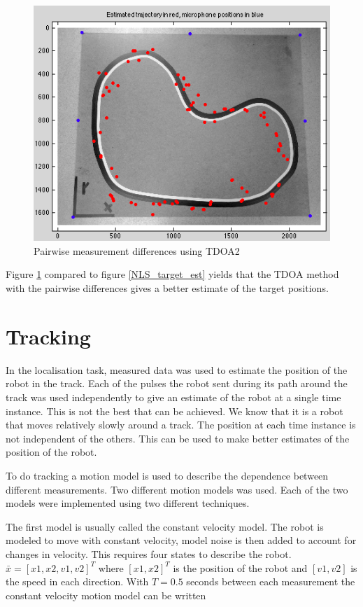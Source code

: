 \documentclass[10pt,a4paper]{report}
\begin{document}
 \begin{figure}[H]
   \includegraphics[width = 350pt]{TDAO_target_est2.png}
   \caption{Pairwise measurement differences using TDOA2}
   \label{TDOA_target_est2}
 \end{figure}
Figure \ref{TDOA_target_est2} compared to figure \ref{NLS_target_est} yields that the TDOA method with the pairwise differences gives a better estimate of the target positions. 


\newpage
\section{Tracking}
\label{Tracking}
In the localisation task, measured data was used to estimate the position of the robot in the track.
Each of the pulses the robot sent during its path around the track was used independently to give an estimate of the robot at a single time instance.
This is not the best that can be achieved. We know that it is a robot that moves relatively slowly around a track.
The position at each time instance is not independent of the others.
This can be used to make better estimates of the position of the robot.

To do tracking a motion model is used to describe the dependence between different measurements.
Two different motion models was used. Each of the two models were implemented using two different techniques.

The first model is usually called the constant velocity model.
The robot is modeled to move with constant velocity, model noise is then added to account for changes in velocity.
This requires four states to describe the robot.
$\bar{x} = [x1, x2, v1, v2]^T$ where $[x1, x2]^T$ is the position of the robot and $[v1, v2]$ is the speed in each direction.
With $T = 0.5$ seconds between each measurement the constant velocity motion model can be written
\end{document}
